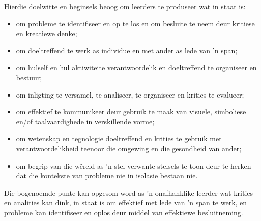 Hierdie doelwitte en beginsels beoog om leerders te produseer wat in
staat is:
\begin{itemize}[noitemsep]
\item
  om probleme te identifiseer en op te los en om besluite te neem deur
  kritiese en kreatiewe denke;
\item
  om doeltreffend te werk as individue en met ander as lede van 'n
  span;
\item
  om hulself en hul aktiwiteite verantwoordelik en doeltreffend te
  organiseer en bestuur;
\item
  om inligting te versamel, te analiseer, te organiseer en krities te
  evalueer;
\item
  om effektief te kommunikeer deur gebruik te maak van visuele,
  simboliese en/of taalvaardighede in verskillende vorme;
\item
  om wetenskap en tegnologie doeltreffend en krities te gebruik met
  verantwoordelikheid teenoor die omgewing en die gesondheid van
  ander;
\item
  om begrip van die w\^{e}reld as 'n stel verwante stelsels te toon deur
  te herken dat die kontekste van probleme nie in isolasie bestaan
  nie.
\end{itemize}
Die bogenoemde punte kan opgesom word as 'n onafhanklike leerder wat
krities en analities kan dink, in staat is om effektief met lede van
'n span te werk, en probleme kan identifiseer en oplos deur middel van
effektiewe besluitneming.
